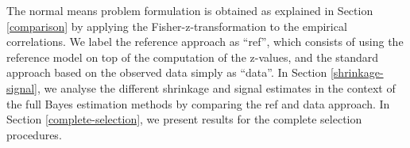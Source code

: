\documentclass[american,]{article}
\theoremstyle{definition}
\begin{document}
The normal means problem formulation is obtained as explained in
Section \ref{comparison} by applying the Fisher-z-transformation to
the empirical correlations. We label the reference approach as
``ref'', which consists of using the reference model on top of the
computation of the z-values, and the standard approach based on the
observed data simply as ``data''. In Section \ref{shrinkage-signal},
we analyse the different shrinkage and signal estimates in the context
of the full Bayes estimation methods by comparing the ref and data
approach. In Section \ref{complete-selection}, we present results for
the complete selection procedures.


\end{document}
